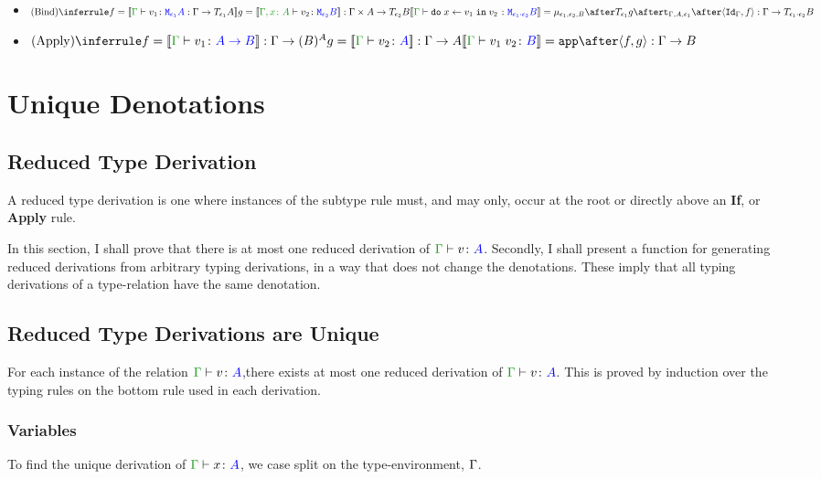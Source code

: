 \documentclass{report}
\begin{document}
\begin{itemize}
    \item $\ntreeruleII{Bind}{f = \deno{\typerelation{\G}{v_1}{\M{\e_1}{A}} : \G \rightarrow \T{\e_1}{A}}}{{ g = \deno{\typerelation{\gax}{v_2}{\M{\e_2}{B}}}}: \G \times A \rightarrow \T{\e_2}{B}}{\deno{\typerelation{\G}{\doin{x}{v_1}{v_2}}{\M{\e_1 \dot \e_2}{B}}} = \bind{\e_1}{\e_2}{B} \after \T{\e_1}{g} \after \tstrength{\G}{A}{\e_1} \after \pr{\idg}{f}: \G \rightarrow \T{\e_1 \dot \e_2}{B}}$ 
    
    \item $\ntreeruleII{Apply}{f = \deno{\gtyperelation{v_1}{\ab}}: \G \rightarrow (B)^{A} }{ g=\deno{\gtyperelation{v_2}{A}}: \G \rightarrow A}{\deno{\gtyperelation{\apply{v_1}{v_2}}{B}}= \app\after\pr{f}{g}: \G \rightarrow B }$
\end{itemize}  

\chapter{Unique Denotations}
 
\section{Reduced Type Derivation}
A reduced type derivation is one where instances of the subtype rule must, and may only, occur at the root or directly above an \textbf{If}, or \textbf{Apply} rule.

In this section, I shall prove that there is at most one reduced derivation of $\gtyperelation{v}{A}$. Secondly, I shall present a function for generating reduced derivations from arbitrary typing derivations, in a way that does not change the denotations. These imply that all typing derivations of a type-relation have the same denotation.

\section{Reduced Type Derivations are Unique}
For each instance of the relation $\gtyperelation{v}{A}$,there exists at most one reduced derivation of  $\gtyperelation{v}{A}$. This is proved by induction over the typing rules on the bottom rule used in each derivation.
\subsection{Variables}
To find the unique derivation of $\gtyperelation{x}{A}$, we case split on the type-environment, $\Gamma$.
\end{document}
